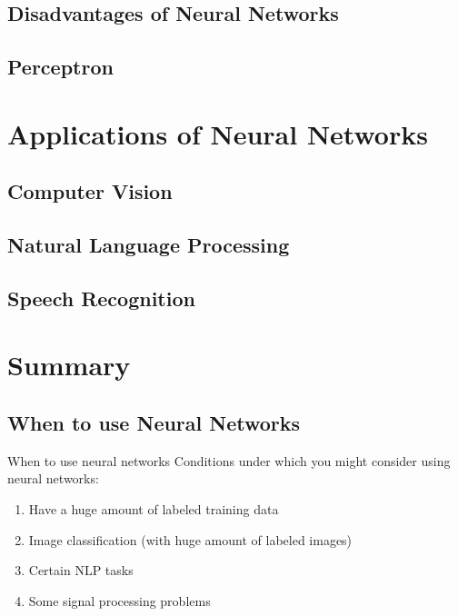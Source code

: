 \documentclass[pdf]{beamer}
\begin{document}
\subsection{Disadvantages of Neural Networks}

\subsection{Perceptron}


\section{Applications of Neural Networks}

\subsection{Computer Vision}
		
\subsection{Natural Language Processing}

\subsection{Speech Recognition}


\section{Summary}

\subsection{When to use Neural Networks}
	\begin{frame}{When to use neural networks}
		Conditions under which you might consider using neural networks:
		\begin{enumerate}
			\item Have a huge amount of labeled training data
			\item Image classification (with huge amount of labeled images)
			\item Certain NLP tasks
			\item Some signal processing problems
		\end{enumerate}
	\end{frame}
\end{document}
